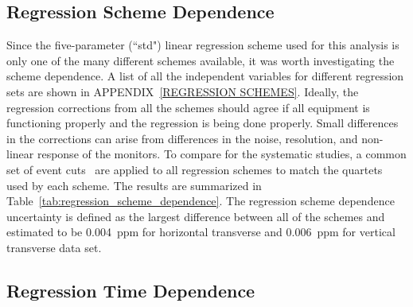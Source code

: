 \subsection{Regression Scheme Dependence}
\label{Regression Scheme Dependence}

Since the five-parameter (``std") linear regression scheme used for this analysis is only one of the many different schemes available, it was worth investigating the scheme dependence. A list of all the independent variables for different regression sets are shown in APPENDIX~\ref{REGRESSION SCHEMES}. Ideally, the regression corrections from all the schemes should agree if all equipment is functioning properly and the regression is being done properly. Small differences in the corrections can arise from differences in the noise, resolution, and non-linear response of the monitors. To compare for the systematic studies, a common set of event cuts~\cite{rakitha_qweak} are applied to all regression schemes to match the quartets used by each scheme.
The results are summarized in Table~\ref{tab:regression_scheme_dependence}. The regression scheme dependence uncertainty is defined as the largest difference between all of the schemes and estimated to be 0.004~ppm for horizontal transverse and 0.006~ppm for vertical transverse data set.


\subsection{Regression Time Dependence}
\label{Regression Time Dependence}

